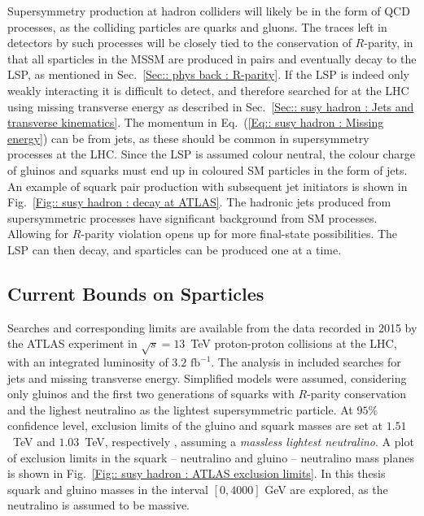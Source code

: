 \documentclass[twoside,english]{uiofysmaster}
\begin{document}
{Supersymmetry production at hadron colliders will likely be in the form of QCD processes, as the colliding particles are quarks and gluons. The traces left in detectors by such processes will be closely tied to the conservation of $R$-parity, in that all sparticles in the MSSM are produced in pairs and eventually decay to the LSP, as mentioned in Sec.~\ref{Sec:: phys back : R-parity}. If the LSP is indeed only weakly interacting it is difficult to detect, and therefore searched for at the LHC using missing transverse energy as described in Sec.~\ref{Sec:: susy hadron : Jets and transverse kinematics}. The momentum in Eq.~(\ref{Eq:: susy hadron : Missing energy}) can be from jets, as these should be common in supersymmetry processes at the LHC. Since the LSP is assumed colour neutral, the colour charge of gluinos and squarks must end up in coloured SM particles in the form of jets. An example of squark pair production with subsequent jet initiators is shown in Fig.~\ref{Fig:: susy hadron : decay at ATLAS}. The hadronic jets produced from supersymmetric processes have significant background from SM processes. Allowing for $R$-parity violation opens up for more final-state possibilities. The LSP can then decay, and sparticles can be produced one at a time. 




\subsection{Current Bounds on Sparticles}



Searches and corresponding limits are available from the data recorded in 2015 by the ATLAS experiment in $\sqrt{s}=13$~TeV proton-proton collisions at the LHC, with an integrated luminosity of $3.2 \text{ fb}^{-1}$. The analysis in \cite{aaboud2016search} included searches for jets and missing transverse energy. Simplified models were assumed, considering only gluinos and the first two generations of squarks with $R$-parity conservation and the lighest neutralino as the lightest supersymmetric particle. At $95 \%$ confidence level, exclusion limits of the gluino and squark masses are set at $1.51$~TeV and $1.03$~TeV, respectively \cite{aaboud2016search}, assuming a \textit{massless lightest neutralino}. A plot of exclusion limits in the squark -- neutralino and gluino -- neutralino mass planes is shown in Fig.\ \ref{Fig:: susy hadron : ATLAS exclusion limits}. In this thesis squark and gluino masses in the interval $[0,4000]$ GeV are explored, as the neutralino is assumed to be massive.


}
\end{document}
